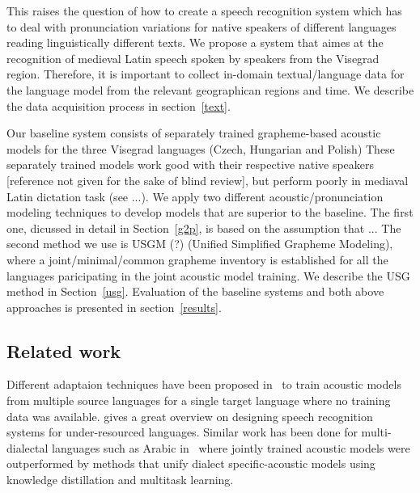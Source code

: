 \documentclass[runningheads,a4paper]{llncs}
\begin{document}
This raises the question of how to create a speech recognition system which has to deal with pronunciation variations for native speakers of different languages reading linguistically different texts.
We propose a system that aimes at the recognition of medieval Latin speech spoken by speakers from the Visegrad region.
Therefore, it is important to collect in-domain textual/language data for the language model from the relevant geographican regions and time.
We describe the data acquisition process in section~\ref{text}.

Our baseline system consists of separately trained grapheme-based acoustic models for the three Visegrad languages (Czech, Hungarian and Polish)
These separately trained models work good with their respective native speakers [reference not given for the sake of blind review], but perform poorly in mediaval Latin dictation task (see ...).
We apply two different acoustic/pronunciation modeling techniques to develop models that are superior to the baseline.
The first one, dicussed in detail in Section~\ref{g2p}, is based on the assumption that ...
The second method we use is USGM (?) (Unified Simplified Grapheme Modeling), where a joint/minimal/common grapheme inventory is established for all the languages paricipating in the joint acoustic model training.
We describe the USG method in Section~\ref{usg}.
Evaluation of the baseline systems and both above approaches is presented in section~\ref{results}.

\subsection{Related work}
Different adaptaion techniques have been proposed in~\cite{schultz01} to train acoustic models from multiple source languages for a single target language where no training data was available.
\cite{besacier14} gives a great overview on designing speech recognition systems for under-resourced languages.
Similar work has been done for multi-dialectal languages such as Arabic in~\cite{elfeky16} where jointly trained acoustic models were outperformed by methods that unify dialect specific-acoustic models using knowledge distillation and multitask learning.
\end{document}
